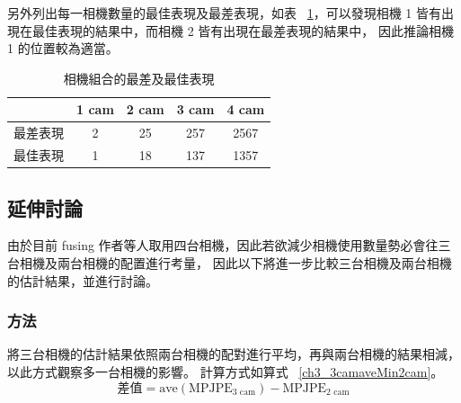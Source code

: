 另外列出每一相機數量的最佳表現及最差表現，如表 ~\ref{ch3_best_worst_camset}，可以發現相機 1 皆有出現在最佳表現的結果中，而相機 2 皆有出現在最差表現的結果中，
因此推論相機 1 的位置較為適當。
\begin{table}[!ht]
   \caption[相機組合的最差及最佳表現]{相機組合的最差及最佳表現}
   \centering
   \label{ch3_best_worst_camset}
   \setlength{\tabcolsep}{3pt}
   \renewcommand\arraystretch{1.5}
   \begin{tabular}{c|c|c|c|c}
       & 1 cam & 2 cam & 3 cam & 4 cam \\ 
      \midrule[2pt]
      最差表現 & 2 & 25 & 257 & 2567 \\
      最佳表現 & 1 & 18 & 137 & 1357 \\
   \end{tabular}
\end{table}

\subsection{延伸討論}
由於目前 fusing 作者等人取用四台相機，因此若欲減少相機使用數量勢必會往三台相機及兩台相機的配置進行考量，
因此以下將進一步比較三台相機及兩台相機的估計結果，並進行討論。

\subsubsection{方法}
將三台相機的估計結果依照兩台相機的配對進行平均，再與兩台相機的結果相減，以此方式觀察多一台相機的影響。
計算方式如算式 ~\ref{ch3_3camaveMin2cam}。
\begin{equation}
   \label{ch3_3camaveMin2cam}
   \text{差值} = \text{ave}(\text{MPJPE}_{3 \text{ cam}})-\text{MPJPE}_{2 \text{ cam}}
\end{equation}

